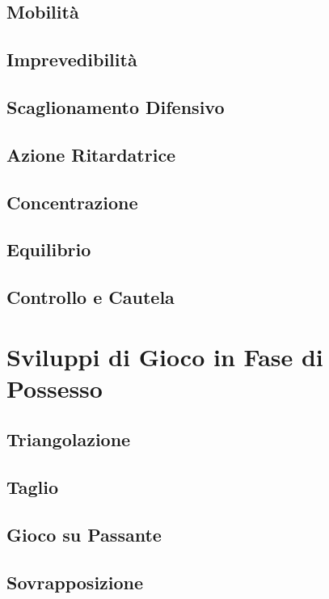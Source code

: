\documentclass[../uefaC.tex]{subfiles}
\begin{document}
\subsection{Mobilità}

\subsection{Imprevedibilità}

\subsection{Scaglionamento Difensivo}

\subsection{Azione Ritardatrice}

\subsection{Concentrazione}

\subsection{Equilibrio}

\subsection{Controllo e Cautela}

\section{Sviluppi di Gioco in Fase di Possesso}

\subsection{Triangolazione}

\subsection{Taglio}

\subsection{Gioco su Passante}

\subsection{Sovrapposizione}
\end{document}
